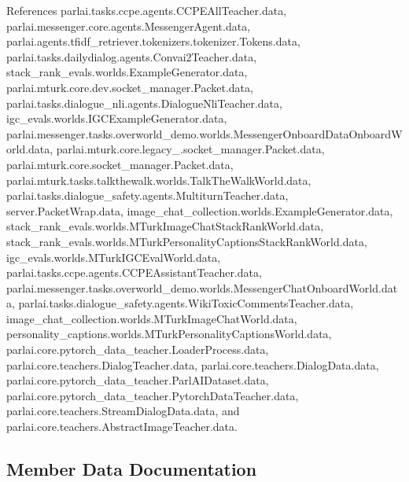 References parlai.\+tasks.\+ccpe.\+agents.\+C\+C\+P\+E\+All\+Teacher.\+data, parlai.\+messenger.\+core.\+agents.\+Messenger\+Agent.\+data, parlai.\+agents.\+tfidf\+\_\+retriever.\+tokenizers.\+tokenizer.\+Tokens.\+data, parlai.\+tasks.\+dailydialog.\+agents.\+Convai2\+Teacher.\+data, stack\+\_\+rank\+\_\+evals.\+worlds.\+Example\+Generator.\+data, parlai.\+mturk.\+core.\+dev.\+socket\+\_\+manager.\+Packet.\+data, parlai.\+tasks.\+dialogue\+\_\+nli.\+agents.\+Dialogue\+Nli\+Teacher.\+data, igc\+\_\+evals.\+worlds.\+I\+G\+C\+Example\+Generator.\+data, parlai.\+messenger.\+tasks.\+overworld\+\_\+demo.\+worlds.\+Messenger\+Onboard\+Data\+Onboard\+World.\+data, parlai.\+mturk.\+core.\+legacy\+\_.\+socket\+\_\+manager.\+Packet.\+data, parlai.\+mturk.\+core.\+socket\+\_\+manager.\+Packet.\+data, parlai.\+mturk.\+tasks.\+talkthewalk.\+worlds.\+Talk\+The\+Walk\+World.\+data, parlai.\+tasks.\+dialogue\+\_\+safety.\+agents.\+Multiturn\+Teacher.\+data, server.\+Packet\+Wrap.\+data, image\+\_\+chat\+\_\+collection.\+worlds.\+Example\+Generator.\+data, stack\+\_\+rank\+\_\+evals.\+worlds.\+M\+Turk\+Image\+Chat\+Stack\+Rank\+World.\+data, stack\+\_\+rank\+\_\+evals.\+worlds.\+M\+Turk\+Personality\+Captions\+Stack\+Rank\+World.\+data, igc\+\_\+evals.\+worlds.\+M\+Turk\+I\+G\+C\+Eval\+World.\+data, parlai.\+tasks.\+ccpe.\+agents.\+C\+C\+P\+E\+Assistant\+Teacher.\+data, parlai.\+messenger.\+tasks.\+overworld\+\_\+demo.\+worlds.\+Messenger\+Chat\+Onboard\+World.\+data, parlai.\+tasks.\+dialogue\+\_\+safety.\+agents.\+Wiki\+Toxic\+Comments\+Teacher.\+data, image\+\_\+chat\+\_\+collection.\+worlds.\+M\+Turk\+Image\+Chat\+World.\+data, personality\+\_\+captions.\+worlds.\+M\+Turk\+Personality\+Captions\+World.\+data, parlai.\+core.\+pytorch\+\_\+data\+\_\+teacher.\+Loader\+Process.\+data, parlai.\+core.\+teachers.\+Dialog\+Teacher.\+data, parlai.\+core.\+teachers.\+Dialog\+Data.\+data, parlai.\+core.\+pytorch\+\_\+data\+\_\+teacher.\+Parl\+A\+I\+Dataset.\+data, parlai.\+core.\+pytorch\+\_\+data\+\_\+teacher.\+Pytorch\+Data\+Teacher.\+data, parlai.\+core.\+teachers.\+Stream\+Dialog\+Data.\+data, and parlai.\+core.\+teachers.\+Abstract\+Image\+Teacher.\+data.



\subsection{Member Data Documentation}
\mbox{\label{classparlai_1_1tasks_1_1dialogue__safety_1_1agents_1_1WikiToxicCommentsTeacher_a9eeb881196ce42d8994dc4884fd9113a}} 
